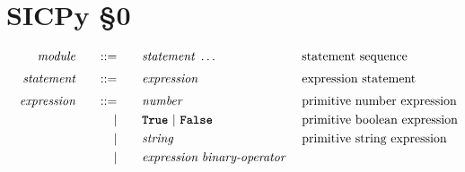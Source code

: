 \section*{SICPy \S0}
\begin{alignat*}{9}
&& \textit{module}       &&\quad ::= &\quad && \textit{statement} \ \ldots 
                                                            && \textrm{statement sequence} \\[1mm]
&& \textit{statement}    &&\quad ::= &\quad &&  \textit{expression} \ %
                                                           && \textrm{expression statement} \\[1mm]
&& \textit{expression}   && ::= &\quad &&  \textit{number}   && \textrm{primitive number expression}\\
&&                       && |   &\quad && \textbf{\texttt{True}}\ |\ \textbf{\texttt{False}}
                                                           && \textrm{primitive boolean expression}\\
&&                       && |   &\quad &&  \textit{string}   && \textrm{primitive string expression}\\
&&                       && |   &\quad &&  \textit{expression} \  \textit{binary-operator} \ 

\end{alignat*}
